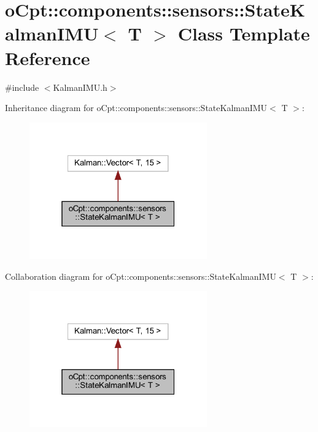 \hypertarget{classo_cpt_1_1components_1_1sensors_1_1_state_kalman_i_m_u}{}\section{o\+Cpt\+:\+:components\+:\+:sensors\+:\+:State\+Kalman\+I\+MU$<$ T $>$ Class Template Reference}
\label{classo_cpt_1_1components_1_1sensors_1_1_state_kalman_i_m_u}


{\ttfamily \#include $<$Kalman\+I\+M\+U.\+h$>$}



Inheritance diagram for o\+Cpt\+:\+:components\+:\+:sensors\+:\+:State\+Kalman\+I\+MU$<$ T $>$\+:
\nopagebreak
\begin{figure}[H]
\begin{center}
\leavevmode
\includegraphics[width=217pt]{classo_cpt_1_1components_1_1sensors_1_1_state_kalman_i_m_u__inherit__graph}
\end{center}
\end{figure}


Collaboration diagram for o\+Cpt\+:\+:components\+:\+:sensors\+:\+:State\+Kalman\+I\+MU$<$ T $>$\+:
\nopagebreak
\begin{figure}[H]
\begin{center}
\leavevmode
\includegraphics[width=217pt]{classo_cpt_1_1components_1_1sensors_1_1_state_kalman_i_m_u__coll__graph}
\end{center}
\end{figure}
